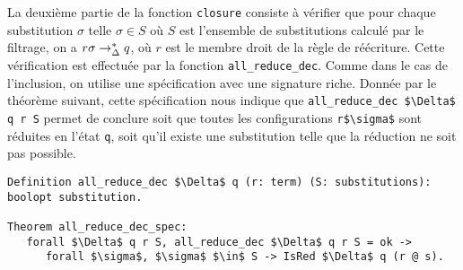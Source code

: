 La deuxième partie de la fonction \lstinline!closure! consiste à vérifier que
pour chaque substitution $\sigma$ telle $\sigma \in S$ où $S$ est l'ensemble de
substitutions calculé par le filtrage, on a $r\sigma \rightarrow_\Delta^* q$, où $r$ est le membre droit 
de la règle de réécriture.
Cette vérification est effectuée par la fonction \lstinline!all_reduce_dec!.
Comme dans le cas de l'inclusion, on utilise une spécification avec une signature
riche. Donnée par le théorème suivant, cette spécification nous indique que 
\lstinline!all_reduce_dec $\Delta$ q r S! permet de conclure soit que toutes
les configurations \lstinline!r$\sigma$! sont réduites en l'état \lstinline!q!,
soit qu'il existe une substitution telle que la réduction ne soit pas possible.
\begin{lstlisting}
Definition all_reduce_dec $\Delta$ q (r: term) (S: substitutions): boolopt substitution.

Theorem all_reduce_dec_spec: 
   forall $\Delta$ q r S, all_reduce_dec $\Delta$ q r S = ok -> 
      forall $\sigma$, $\sigma$ $\in$ S -> IsRed $\Delta$ q (r @ s).
\end{lstlisting}

